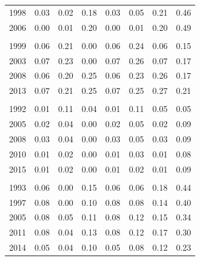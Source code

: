 \documentclass[
  11pt,
a4paper
]{article}
\begin{document}
\begin{longtable}[t]{rrrrrrrr}
\hspace{1em}1998 & 0.03 & 0.02 & 0.18 & 0.03 & 0.05 & 0.21 & 0.46\\
\hspace{1em}2006 & 0.00 & 0.01 & 0.20 & 0.00 & 0.01 & 0.20 & 0.49\\
\addlinespace[0.3em]
\multicolumn{8}{l}{\textbf{Nigeria}}\\
\hspace{1em}1999 & 0.06 & 0.21 & 0.00 & 0.06 & 0.24 & 0.06 & 0.15\\
\hspace{1em}2003 & 0.07 & 0.23 & 0.00 & 0.07 & 0.26 & 0.07 & 0.17\\
\hspace{1em}2008 & 0.06 & 0.20 & 0.25 & 0.06 & 0.23 & 0.26 & 0.17\\
\hspace{1em}2013 & 0.07 & 0.21 & 0.25 & 0.07 & 0.25 & 0.27 & 0.21\\
\addlinespace[0.3em]
\multicolumn{8}{l}{\textbf{Rwanda}}\\
\hspace{1em}1992 & 0.01 & 0.11 & 0.04 & 0.01 & 0.11 & 0.05 & 0.05\\
\hspace{1em}2005 & 0.02 & 0.04 & 0.00 & 0.02 & 0.05 & 0.02 & 0.09\\
\hspace{1em}2008 & 0.03 & 0.04 & 0.00 & 0.03 & 0.05 & 0.03 & 0.09\\
\hspace{1em}2010 & 0.01 & 0.02 & 0.00 & 0.01 & 0.03 & 0.01 & 0.08\\
\hspace{1em}2015 & 0.01 & 0.02 & 0.00 & 0.01 & 0.02 & 0.01 & 0.09\\
\addlinespace[0.3em]
\multicolumn{8}{l}{\textbf{Senegal}}\\
\hspace{1em}1993 & 0.06 & 0.00 & 0.15 & 0.06 & 0.06 & 0.18 & 0.44\\
\hspace{1em}1997 & 0.08 & 0.00 & 0.10 & 0.08 & 0.08 & 0.14 & 0.40\\
\hspace{1em}2005 & 0.08 & 0.05 & 0.11 & 0.08 & 0.12 & 0.15 & 0.34\\
\hspace{1em}2011 & 0.08 & 0.04 & 0.13 & 0.08 & 0.12 & 0.17 & 0.30\\
\hspace{1em}2014 & 0.05 & 0.04 & 0.10 & 0.05 & 0.08 & 0.12 & 0.23\\

\end{longtable}
\end{document}
